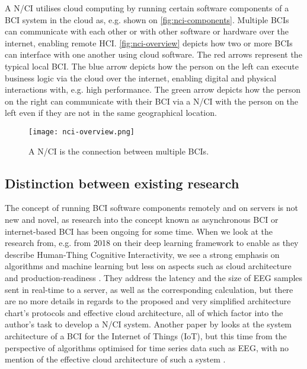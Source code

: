 A N/CI utilises cloud computing by running certain software components of a BCI system in the cloud as, e.g. shown on \autoref{fig:nci-components}. Multiple BCIs can communicate with each other or with other software or hardware over the internet, enabling remote HCI. \autoref{fig:nci-overview} depicts how two or more BCIs can interface with one another using cloud software. The red arrows represent the typical local BCI. The blue arrow depicts how the person on the left can execute business logic via the cloud over the internet, enabling digital and physical interactions with, e.g. high performance. The green arrow depicts how the person on the right can communicate with their BCI via a N/CI with the person on the left even if they are not in the same geographical location.

\begin{figure}[ht]
  \centering
  \texttt{[image: nci-overview.png]}
  \caption{A N/CI is the connection between multiple BCIs.}
  \label{fig:nci-overview}
\end{figure}

\subsection{Distinction between existing research}
\label{chapter2-distinction-between-existing-research}

The concept of running BCI software components remotely and on servers is not new and novel, as research into the concept known as asynchronous BCI \citep{an_design_2016} or internet-based BCI \citep{lampe_brain-computer_2014} has been ongoing for some time. When we look at the research from, e.g. \citeauthor{zhang_internet_2018} from 2018 on their deep learning framework to enable as they describe Human-Thing Cognitive Interactivity, we see a strong emphasis on algorithms and machine learning but less on aspects such as cloud architecture and production-readiness \citep{zhang_internet_2018}. They address the latency and the size of EEG samples sent in real-time to a server, as well as the corresponding calculation, but there are no more details in regards to the proposed and very simplified architecture chart's protocols and effective cloud architecture, all of which factor into the author's task to develop a N/CI system. Another paper by \citeauthor{ahamad_system_2022} looks at the system architecture of a BCI for the Internet of Things (IoT), but this time from the perspective of algorithms optimised for time series data such as EEG, with no mention of the effective cloud architecture of such a system \citep{ahamad_system_2022}.

